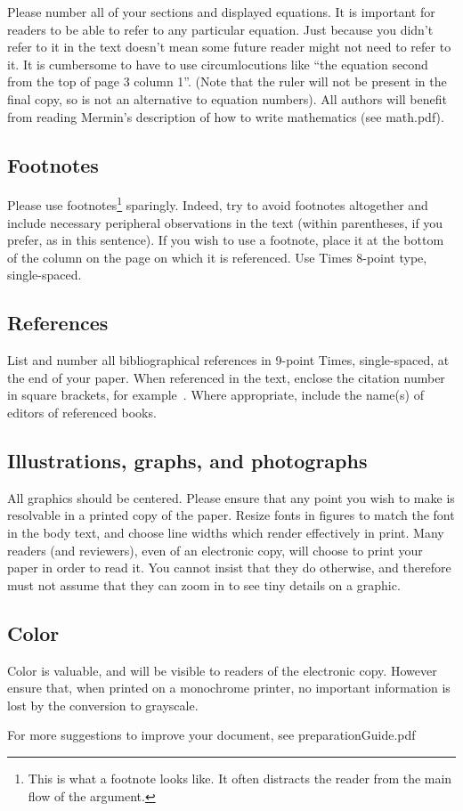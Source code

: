 Please number all of your sections and displayed equations.  It is
important for readers to be able to refer to any particular equation.  Just
because you didn't refer to it in the text doesn't mean some future reader
might not need to refer to it.  It is cumbersome to have to use
circumlocutions like ``the equation second from the top of page 3 column
1''.  (Note that the ruler will not be present in the final copy, so is not
an alternative to equation numbers).  All authors will benefit from reading
Mermin's description of how to write mathematics (see math.pdf).

\subsection{Footnotes}

Please use footnotes\footnote {This is what a footnote looks like.  It
often distracts the reader from the main flow of the argument.} sparingly.
Indeed, try to avoid footnotes altogether and include necessary peripheral
observations in 
the text (within parentheses, if you prefer, as in this sentence).  If you
wish to use a footnote, place it at the bottom of the column on the page on
which it is referenced. Use Times 8-point type, single-spaced.

\subsection{References}

List and number all bibliographical references in 9-point Times,
single-spaced, at the end of your paper. When referenced in the text,
enclose the citation number in square brackets, for
example~\cite{Authors06}.  Where appropriate, include the name(s) of
editors of referenced books.

\subsection{Illustrations, graphs, and photographs}

All graphics should be centered.  Please ensure that any point you wish to
make is resolvable in a printed copy of the paper.  Resize fonts in figures
to match the font in the body text, and choose line widths which render
effectively in print.  Many readers (and reviewers), even of an electronic
copy, will choose to print your paper in order to read it.  You cannot
insist that they do otherwise, and therefore must not assume that they can
zoom in to see tiny details on a graphic.

\subsection{Color}

Color is valuable, and will be visible to readers of the electronic copy.
However ensure that, when printed on a monochrome printer, no important
information is lost by the conversion to grayscale.


For more suggestions to improve your document, see preparationGuide.pdf